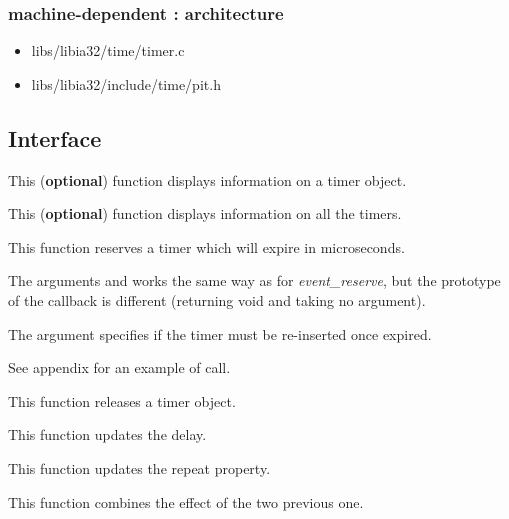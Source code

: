 \subsubsection{\color{filerefcolor} machine-dependent : architecture}
\begin{itemize}
\item libs/libia32/time/timer.c
\item libs/libia32/include/time/pit.h
\end{itemize}

\newpage
\subsection*{Interface}

	 {
	   This (\textbf{optional}) function displays information on a
	   timer object.
	 }

	 {
	   This (\textbf{optional}) function displays information on
	   all the timers.
	 }

	 {
	   This function reserves a timer which will expire in
	    microseconds.

	   The arguments  and  works
	   the same way as for \emph{event\_reserve}, but the
	   prototype of the callback is different (returning void and
	   taking no argument).

	   The  argument specifies if the timer
	   must be re-inserted once expired.

	   See appendix for an example of call.
	 }

	 {
	   This function releases a timer object.
	 }

	 {
	   This function updates the delay.
	 }

	 {
	   This function updates the repeat property.
	 }

	 {
	   This function combines the effect of the two previous one.
	 }

